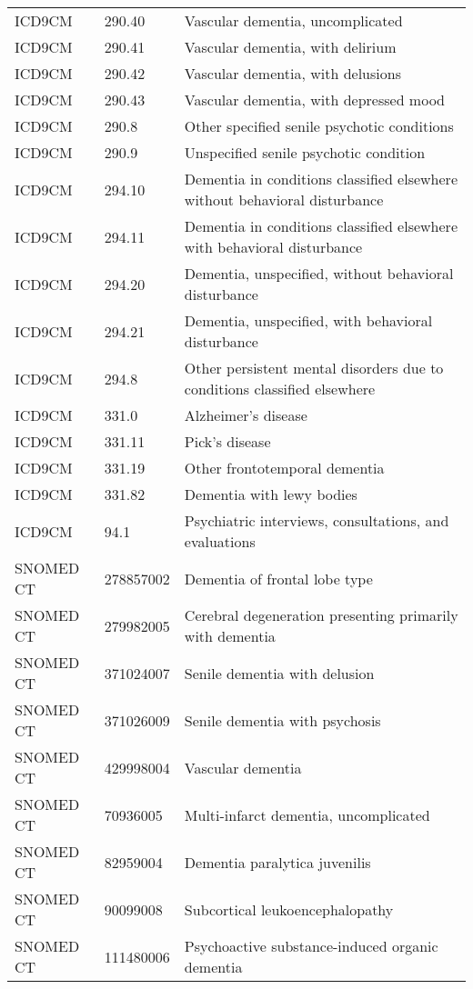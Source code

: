 \begin{longtable}{p{}p{}p{}}
  ICD9CM & 290.40 & Vascular dementia, uncomplicated \\ 
  ICD9CM & 290.41 & Vascular dementia, with delirium \\ 
  ICD9CM & 290.42 & Vascular dementia, with delusions \\ 
  ICD9CM & 290.43 & Vascular dementia, with depressed mood \\ 
  ICD9CM & 290.8 & Other specified senile psychotic conditions \\ 
  ICD9CM & 290.9 & Unspecified senile psychotic condition \\ 
  ICD9CM & 294.10 & Dementia in conditions classified elsewhere without behavioral disturbance \\ 
  ICD9CM & 294.11 & Dementia in conditions classified elsewhere with behavioral disturbance \\ 
  ICD9CM & 294.20 & Dementia, unspecified, without behavioral disturbance \\ 
  ICD9CM & 294.21 & Dementia, unspecified, with behavioral disturbance \\ 
  ICD9CM & 294.8 & Other persistent mental disorders due to conditions classified elsewhere \\ 
  ICD9CM & 331.0 & Alzheimer's disease \\ 
  ICD9CM & 331.11 & Pick's disease \\ 
  ICD9CM & 331.19 & Other frontotemporal dementia \\ 
  ICD9CM & 331.82 & Dementia with lewy bodies \\ 
  ICD9CM & 94.1 & Psychiatric interviews, consultations, and evaluations \\ 
  SNOMED CT & 278857002 & Dementia of frontal lobe type \\ 
  SNOMED CT & 279982005 & Cerebral degeneration presenting primarily with dementia \\ 
  SNOMED CT & 371024007 & Senile dementia with delusion \\ 
  SNOMED CT & 371026009 & Senile dementia with psychosis \\ 
  SNOMED CT & 429998004 & Vascular dementia \\ 
  SNOMED CT & 70936005 & Multi-infarct dementia, uncomplicated \\ 
  SNOMED CT & 82959004 & Dementia paralytica juvenilis \\ 
  SNOMED CT & 90099008 & Subcortical leukoencephalopathy \\ 
  SNOMED CT & 111480006 & Psychoactive substance-induced organic dementia \\ 

\end{longtable}
